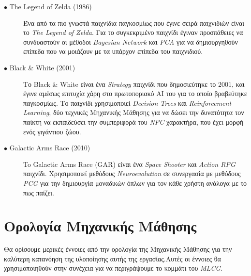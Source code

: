 \begin{description}

\item[$\bullet$ The Legend of Zelda (1986)] Ένα από τα πιο γνωστά παιχνίδια παγκοσμίως που έγινε σειρά παιχνιδιών είναι το \textit{The Legend of Zelda}. Για το συγκεκριμένο παιχνίδι έγιναν προσπάθειες να συνδυαστούν οι μέθοδοι \textit{Bayesian Network} και \textit{PCA} για να δημιουργηθούν επίπεδα που να μοιάζουν με τα υπάρχον επίπεδα του παιχνιδιού. \cite{legofzelda}

\item[$\bullet$ Black \& White (2001)] Το Black \& White είναι ένα \textit{Strategy} παιχνίδι που δημοσιεύτηκε το 2001, και έγινε αμέσως επιτυχία χάρη στο πρωτοποριακό AI του για το οποίο βραβεύτηκε παγκοσμίως. Το παιχνίδι χρησιμοποιεί \textit{Decision Trees} και \textit{Reinforcement Learning}, δύο τεχνικές Μηχανικής Μάθησης για να δώσει την δυνατότητα τον παίκτη να εκπαιδεύσει την συμπεριφορά του \textit{NPC} χαρακτήρα, που έχει μορφή ενός γιγάντιου ζώου. \cite{bandw}

\item[$\bullet$ Galactic Arms Race (2010)] To Galactic Arms Race (GAR) είναι ένα \textit{Space Shooter} και \textit{Action RPG} παιχνίδι. Χρησιμοποιεί μεθόδους \textit{Neuroevolution} σε συνεργασία με μεθόδους \textit{PCG} για την δημιουργία μοναδικών όπλων για τον κάθε χρήστη ανάλογα με το πως παίζει. \cite{bandw}


\end{description}


\section{Ορολογία Μηχανικής Μάθησης}
Θα ορίσουμε μερικές έννοιες από την ορολογία της Μηχανικής Μάθησης για την καλύτερη κατανόηση της υλοποίησης αυτής της εργασίας.Αυτές οι έννοιες θα χρησιμοποιηθούν στην συνέχεια για να περιγράψουμε το κομμάτι του \textit{MLCG}.

